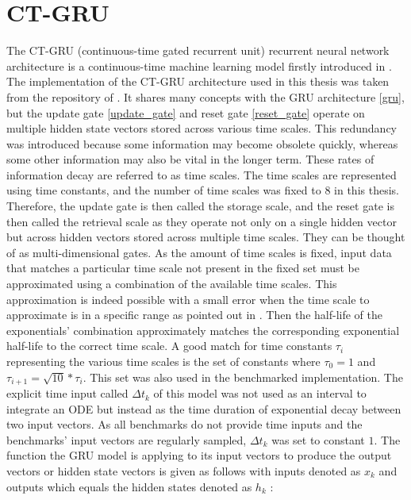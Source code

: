 \documentclass[draft,final]{vutinfth} %
\begin{document}
    \section{CT-GRU} \label{ctgru}
    The CT-GRU (continuous-time gated recurrent unit) recurrent neural network architecture is a continuous-time machine learning model firstly introduced in \cite{CTGRU}.
    The implementation of the CT-GRU architecture used in this thesis was taken from the repository of \cite{ODELSTM}.
    It shares many concepts with the GRU architecture \ref{gru}, but the update gate \ref{update_gate} and reset gate \ref{reset_gate} operate on multiple hidden state vectors stored across various time scales.
    This redundancy was introduced because some information may become obsolete quickly, whereas some other information may also be vital in the longer term.
    These rates of information decay are referred to as time scales.
    The time scales are represented using time constants, and the number of time scales was fixed to $8$ in this thesis.
    Therefore, the update gate is then called the storage scale, and the reset gate is then called the retrieval scale as they operate not only on a single hidden vector but across hidden vectors stored across multiple time scales.
    They can be thought of as multi-dimensional gates.
    As the amount of time scales is fixed, input data that matches a particular time scale not present in the fixed set must be approximated using a combination of the available time scales.
    This approximation is indeed possible with a small error when the time scale to approximate is in a specific range as pointed out in \cite[p. 5-6]{CTGRU}.
    Then the half-life of the exponentials' combination approximately matches the corresponding exponential half-life to the correct time scale.
    A good match for time constants $\tau_i$ representing the various time scales is the set of constants where $\tau_0=1$ and $\tau_{i+1} = \sqrt{10} * \tau_{i}$.
    This set was also used in the benchmarked implementation.
    The explicit time input called $\Delta t_k$ of this model was not used as an interval to integrate an ODE but instead as the time duration of exponential decay between two input vectors.
    As all benchmarks do not provide time inputs and the benchmarks' input vectors are regularly sampled, $\Delta t_k$ was set to constant $1$.
    The function the GRU model is applying to its input vectors to produce the output vectors or hidden state vectors is given as follows with inputs denoted as $x_k$ and outputs which equals the hidden states denoted as $h_k$ \cite[p. 7]{CTGRU}:
\end{document}
